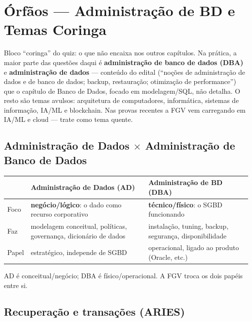 \chapter{Órfãos --- Administração de BD e Temas Coringa}
\label{cap:orfaos}

\begin{conceito}
Bloco ``coringa'' do quiz: o que não encaixa nos outros capítulos. Na
prática, a maior parte das questões daqui é \textbf{administração de banco de
dados (DBA)} e \textbf{administração de dados} --- conteúdo do edital
(``noções de administração de dados e de banco de dados; backup, restauração;
otimização de performance'') que o capítulo de Banco de Dados, focado em
modelagem/SQL, não detalha. O resto são temas avulsos: arquitetura de
computadores, informática, sistemas de informação, IA/ML e blockchain. Nas
provas recentes a FGV vem carregando em IA/ML e cloud --- trate como tema
quente.
\end{conceito}

\section{Administração de Dados $\times$ Administração de Banco de Dados}

\begin{center}
\begin{tabular}{@{}p{2.2cm}p{4.6cm}p{4.6cm}@{}}
\toprule
& \textbf{Administração de Dados (AD)} & \textbf{Administração de BD (DBA)} \\
\midrule
Foco & \textbf{negócio/lógico}: o dado como recurso corporativo & \textbf{técnico/físico}: o SGBD funcionando \\
Faz & modelagem conceitual, políticas, governança, dicionário de dados & instalação, tuning, backup, segurança, disponibilidade \\
Papel & estratégico, independe de SGBD & operacional, ligado ao produto (Oracle, etc.) \\
\bottomrule
\end{tabular}
\end{center}

\begin{pegadinha}
AD é conceitual/negócio; DBA é físico/operacional. A FGV troca os dois papéis
entre si.
\end{pegadinha}

\section{Recuperação e transações (ARIES)}

